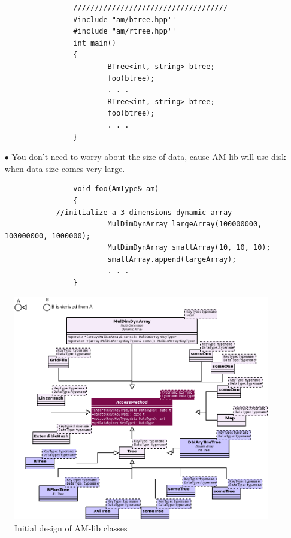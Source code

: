 \documentclass[a4paper,10pt]{article}
\begin{document}
\begin{itemize}
\begin{scriptsize}
\begin{verbatim}
                ////////////////////////////////////
                #include "am/btree.hpp''
                #include "am/rtree.hpp''
                int main()
                {
                        BTree<int, string> btree;
                        foo(btree);
                        . . .
                        RTree<int, string> btree;
                        foo(btree);
                        . . .
                }
\end{verbatim}                \end{scriptsize}

\item[$\bullet$] You don't need to worry about the size of data, cause AM-lib will use disk when data size comes very large.
\begin{scriptsize}\begin{verbatim}
                void foo(AmType& am)
                {
			//initialize a 3 dimensions dynamic array
                        MulDimDynArray largeArray(100000000, 100000000, 1000000);
                        MulDimDynArray smallArray(10, 10, 10);
                        smallArray.append(largeArray);
                        . . .
                }
\end{verbatim}                \end{scriptsize}

\end{itemize}

\par
\begin{figure}[h!]
\centerline{\includegraphics[width=\textwidth]{architecture.png}}
\caption{Initial design of AM-lib classes}\label{architecture}
\end{figure}
\end{document}
